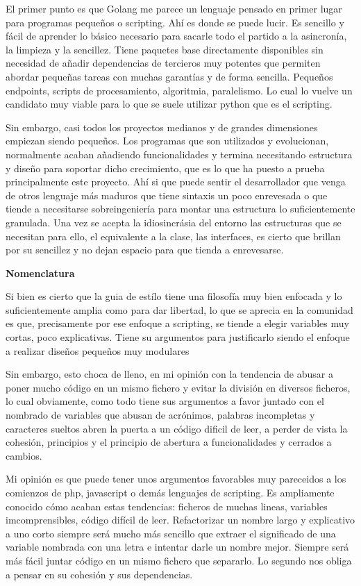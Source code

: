 El primer punto es que Golang me parece un lenguaje pensado en primer lugar para programas pequeños o scripting. Ahí es donde se puede lucir. Es sencillo y fácil de aprender lo básico necesario para sacarle todo el partido a la asincronía, la limpieza y la sencillez. Tiene paquetes base directamente disponibles sin necesidad de añadir dependencias de tercieros muy potentes que permiten abordar pequeñas tareas con muchas garantías y de forma sencilla. Pequeños endpoints, scripts de procesamiento, algoritmia, paralelismo. Lo cual lo vuelve un candidato muy viable para lo que se suele utilizar python que es el scripting.

Sin embargo, casi todos los proyectos medianos y de grandes dimensiones empiezan siendo pequeños. Los programas que son utilizados y evolucionan, normalmente acaban añadiendo funcionalidades y termina necesitando estructura y diseño para soportar dicho crecimiento, que es lo que ha puesto a prueba principalmente este proyecto. Ahí si que puede sentir el desarrollador que venga de otros lenguaje más maduros que tiene sintaxis un poco enrevesada o que tiende a necesitarse sobreingeniería para montar una estructura lo suficientemente granulada. Una vez se acepta la idiosincrásia del entorno las estructuras que se necesitan para ello, el equivalente a la clase, las interfaces, es cierto que brillan por su sencillez y no dejan espacio para que tienda a enrevesarse.

\textbf{Nomenclatura}

Si bien es cierto que la guia de estílo tiene una filosofía muy bien enfocada y lo suficientemente amplia como para dar libertad, lo que se aprecia en la comunidad es que, precisamente por ese enfoque a scripting, se tiende a elegir variables muy cortas, poco explicativas. Tiene su argumentos para justificarlo siendo el enfoque a realizar diseños pequeños muy modulares

Sin embargo, esto choca de lleno, en mi opinión con la tendencia de abusar a poner mucho código en un mismo fichero y evitar la división en diversos ficheros, lo cual obviamente, como todo tiene sus argumentos a favor juntado con el nombrado de variables que abusan de acrónimos, palabras incompletas y caracteres sueltos abren la puerta a un código dificil de leer, a perder de vista la cohesión, principios y el principio de abertura a funcionalidades y cerrados a cambios.

Mi opinión es que puede tener unos argumentos favorables muy pareceidos a los comienzos de php, javascript o demás lenguajes de scripting. Es ampliamente conocido cómo acaban estas tendencias: ficheros de muchas lineas, variables imcomprensibles, código difícil de leer. Refactorizar un nombre largo y explicativo a uno corto siempre será mucho más sencillo que extraer el significado de una variable nombrada con una letra e intentar darle un nombre mejor. Siempre será más fácil juntar código en un mismo fichero que separarlo. Lo segundo nos obliga a pensar en su cohesión y sus dependencias.

